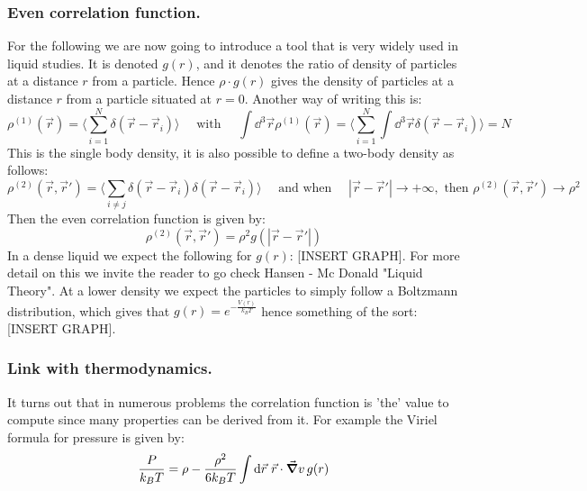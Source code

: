 \documentclass[10pt,a4paper]{book}
\begin{document}
\subsubsection{Even correlation function.}
For the following we are now going to introduce a tool that is very widely used in liquid studies. It is denoted $g(r)$, and it denotes the ratio of density of particles at a distance $r$ from a particle. Hence $\rho \cdot g(r)$ gives the density of particles at a distance $r$ from a particle situated at $r = 0$. Another way of writing this is:
\[
\rho^{(1)}(\vec{r}) = \langle \sum_{i = 1}^N \delta(\vec{r} - \vec{r}_i ) \rangle \quad \text{ with } \quad \int \dd^3 \vec{r} \rho^{(1)}(\vec{r}) = \langle \sum_{i = 1}^N \int \dd^3 \vec{r} \delta(\vec{r} - \vec{r}_i) \rangle = N
\]
This is the single body density, it is also possible to define a two-body density as follows:
\[
\rho^{(2)}(\vec{r}, \vec{r}') = \langle \sum_{i \neq j} \delta(\vec{r} - \vec{r}_i) \delta (\vec{r} - \vec{r}_i) \rangle \quad \text{ and when } \quad |\vec{r} - \vec{r}'| \to +\infty, \text{ then } \rho^{(2)}(\vec{r}, \vec{r}') \to \rho^2
\]
Then the even correlation function is given by:
\[
\rho^{(2)}(\vec{r}, \vec{r}') = \rho^2 g(|\vec{r} - \vec{r}'|)
\]
In a dense liquid we expect the following for $g(r)$: [INSERT GRAPH]. For more detail on this we invite the reader to go check Hansen - Mc Donald "Liquid Theory". At a lower density we expect the particles to simply follow a Boltzmann distribution, which gives that $g(r) = e^{-\frac{V(r)}{k_B T}}$  hence something of the sort: [INSERT GRAPH].

\subsubsection{Link with thermodynamics.}
It turns out that in numerous problems the correlation function is 'the' value to compute since many properties can be derived from it. For example the Viriel formula for pressure is given by:
\[
\frac{P}{k_B T} = \rho - \frac{\rho^2}{6 k_B T} \int \dd \vec{r} \,\,\vec{r} \cdot \vec{\grad} v \,g(r)
\]
\end{document}

